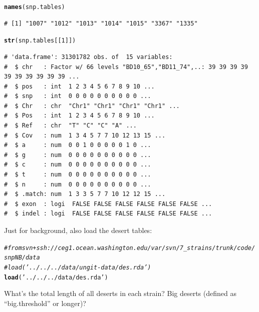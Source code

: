 \documentclass{article}\usepackage[]{graphicx}\usepackage[]{color}
\makeatletter
\newcommand{\hlnum}[1]{\textcolor[rgb]{0.686,0.059,0.569}{#1}}%
\newcommand{\hlstr}[1]{\textcolor[rgb]{0.192,0.494,0.8}{#1}}%
\newcommand{\hlcom}[1]{\textcolor[rgb]{0.678,0.584,0.686}{\textit{#1}}}%
\newcommand{\hlstd}[1]{\textcolor[rgb]{0.345,0.345,0.345}{#1}}%
\newcommand{\hlkwd}[1]{\textcolor[rgb]{0.737,0.353,0.396}{\textbf{#1}}}%
\newenvironment{kframe}{%
 \def\at@end@of@kframe{}%
 \ifinner\ifhmode%
  \def\at@end@of@kframe{\end{minipage}}%
  \begin{minipage}{\columnwidth}%
 \fi\fi%
 \def\FrameCommand##1{\hskip\@totalleftmargin \hskip-\fboxsep
 \colorbox{shadecolor}{##1}\hskip-\fboxsep
     \hskip-\linewidth \hskip-\@totalleftmargin \hskip\columnwidth}%
 \MakeFramed {\advance\hsize-\width
   \@totalleftmargin\z@ \linewidth\hsize
   \@setminipage}}%
 {\par\unskip\endMakeFramed%
 \at@end@of@kframe}
\newenvironment{knitrout}{}{} %
\makeatother
\begin{document}
\begin{knitrout}\footnotesize
{}\color{fgcolor}\begin{kframe}
\begin{alltt}
\hlkwd{names}\hlstd{(snp.tables)}
\end{alltt}
\begin{verbatim}
# [1] "1007" "1012" "1013" "1014" "1015" "3367" "1335"
\end{verbatim}
\begin{alltt}
\hlkwd{str}\hlstd{(snp.tables[[}\hlnum{1}\hlstd{]])}
\end{alltt}
\begin{verbatim}
# 'data.frame':	31301782 obs. of  15 variables:
#  $ chr   : Factor w/ 66 levels "BD10_65","BD11_74",..: 39 39 39 39 39 39 39 39 39 39 ...
#  $ pos   : int  1 2 3 4 5 6 7 8 9 10 ...
#  $ snp   : int  0 0 0 0 0 0 0 0 0 0 ...
#  $ Chr   : chr  "Chr1" "Chr1" "Chr1" "Chr1" ...
#  $ Pos   : int  1 2 3 4 5 6 7 8 9 10 ...
#  $ Ref   : chr  "T" "C" "C" "A" ...
#  $ Cov   : num  1 3 4 5 7 7 10 12 13 15 ...
#  $ a     : num  0 0 1 0 0 0 0 0 1 0 ...
#  $ g     : num  0 0 0 0 0 0 0 0 0 0 ...
#  $ c     : num  0 0 0 0 0 0 0 0 0 0 ...
#  $ t     : num  0 0 0 0 0 0 0 0 0 0 ...
#  $ n     : num  0 0 0 0 0 0 0 0 0 0 ...
#  $ .match: num  1 3 3 5 7 7 10 12 12 15 ...
#  $ exon  : logi  FALSE FALSE FALSE FALSE FALSE FALSE ...
#  $ indel : logi  FALSE FALSE FALSE FALSE FALSE FALSE ...
\end{verbatim}
\end{kframe}
\end{knitrout}

Just for background, also load the desert tables:

\begin{knitrout}\footnotesize
{}\color{fgcolor}\begin{kframe}
\begin{alltt}
\hlcom{# from svn+ssh://ceg1.ocean.washington.edu/var/svn/7_strains/trunk/code/snpNB/data}
\hlcom{#load('../../../data/ungit-data/des.rda')}
\hlkwd{load}\hlstd{(}\hlstr{'../../../data/des.rda'}\hlstd{)}
\end{alltt}
\end{kframe}
\end{knitrout}

What's the total length of all deserts in each strain?  Big deserts (defined as ``big.threshold'' or longer)?
\end{document}
